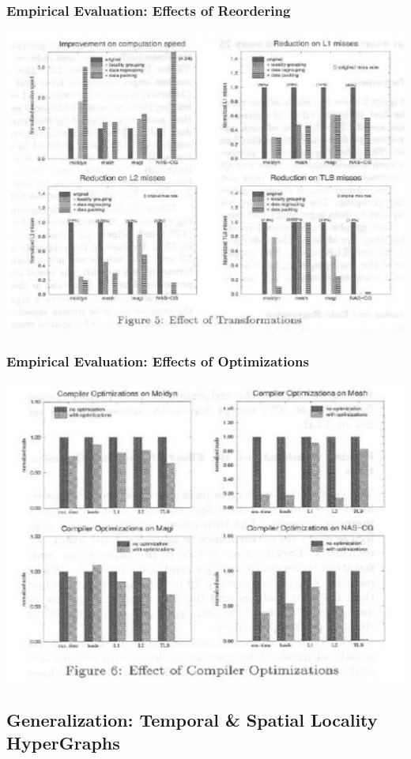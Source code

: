 \documentclass{beamer}
\begin{document}
\begin{frame}[fragile,t]
  \frametitle{Empirical Evaluation: Effects of Reordering}

\includegraphics[width=59ex]{Figures/ResultsReordering1}
 
\end{frame}

\begin{frame}[fragile,t]
  \frametitle{Empirical Evaluation: Effects of Optimizations}

\includegraphics[width=59ex]{Figures/ResultsReordering2}
 
\end{frame}


\subsection{Generalization: Temporal \& Spatial Locality HyperGraphs}
\end{document}
